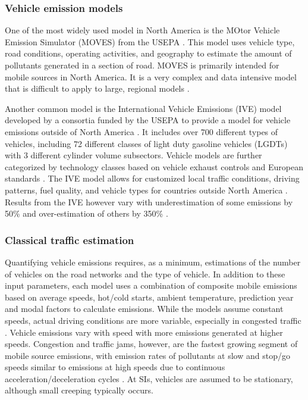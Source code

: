 \subsubsection{Vehicle emission models} \label{sssec:VehEmissionModels}

One of the most widely used model in North America is the MOtor Vehicle Emission Simulator (MOVES) from the USEPA \citep{MOVES2014a}. This model uses vehicle type, road conditions, operating activities, and geography to estimate the amount of pollutants generated in a section of road. MOVES is primarily intended for mobile sources in North America. It is a very complex and data intensive model that is difficult to apply to large, regional models \citep{Zhang2011}.

Another common model is the International Vehicle Emissions (IVE) model developed by a consortia funded by the USEPA to provide a model for vehicle emissions outside of North America \citep{IVE2008}. It includes over 700 different types of vehicles, including 72 different classes of light duty gasoline vehicles (LGDTs) with 3 different cylinder volume subsectors. Vehicle models are further categorized by technology classes based on vehicle exhaust controls and European standards \citep{Davis2005}. The IVE model allows for customized local traffic conditions, driving patterns, fuel quality, and vehicle types for countries outside North America \citep{Davis2010}. Results from the IVE however vary with underestimation of some emissions by 50\% and over-estimation of others by 350\% \citep{Hui2007}.

\subsubsection{Classical traffic estimation} \label{sssec:ClassicalTraffic}

Quantifying vehicle emissions requires, as a minimum, estimations of the number of vehicles on the road networks and the type of vehicle. In addition to these input parameters, each model uses a combination of composite mobile emissions based on average speeds, hot/cold starts, ambient temperature, prediction year and modal factors to calculate emissions\citep{Franco2013}. While the models assume constant speeds, actual driving conditions are more variable, especially in congested traffic \citep{Freeman2015b}. Vehicle emissions vary with speed with more emissions generated at higher speeds. Congestion and traffic jams, however, are the fastest growing segment of mobile source emissions, with emission rates of pollutants at slow and stop/go speeds similar to emissions at high speeds due to continuous acceleration/deceleration cycles \citep{Barth2009}. At SIs, vehicles are assumed to be stationary, although small creeping typically occurs.

